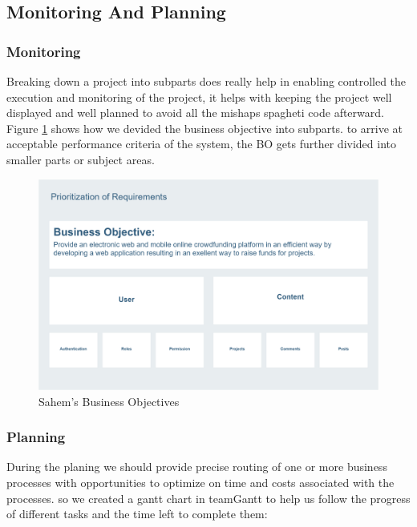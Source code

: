 \subsection{Monitoring And Planning}
\subsubsection*{Monitoring}
Breaking down a project into subparts does really help in enabling controlled the execution and monitoring of the project, it helps with keeping the project well displayed and well planned to avoid all the mishaps spagheti code afterward.\\
Figure \ref{fig:bos} shows how we devided the business objective into subparts. to arrive at acceptable performance criteria of the system, the BO gets further divided into smaller parts or subject areas.
\begin{figure}[!ht]
      \center
      \includegraphics[scale=0.18]{assets/bos.png}
      \caption{Sahem's Business Objectives}
      \label{fig:bos}
\end{figure}
\subsubsection*{Planning}
During the planing we should provide precise routing of one or more business processes with opportunities to optimize on time and costs associated with the processes.
so we created a gantt chart in teamGantt to help us follow the progress of different tasks and the time left to complete them:

